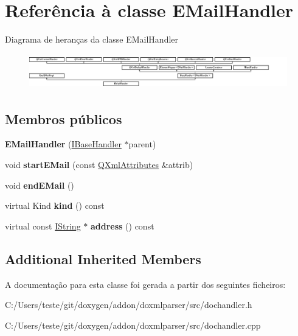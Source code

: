\hypertarget{class_e_mail_handler}{\section{Referência à classe E\-Mail\-Handler}
\label{class_e_mail_handler}
}
Diagrama de heranças da classe E\-Mail\-Handler\begin{figure}[H]
\begin{center}
\leavevmode
\includegraphics[height=1.531100cm]{class_e_mail_handler}
\end{center}
\end{figure}
\subsection*{Membros públicos}
\begin{DoxyCompactItemize}
\item 
\hypertarget{class_e_mail_handler_ab5e67ccdb0e8545996b12fb6977b1086}{{\bfseries E\-Mail\-Handler} (\hyperlink{class_i_base_handler}{I\-Base\-Handler} $\ast$parent)}\label{class_e_mail_handler_ab5e67ccdb0e8545996b12fb6977b1086}

\item 
\hypertarget{class_e_mail_handler_a10b3ee7bb8e8ffea0fa0db0a366e7c68}{void {\bfseries start\-E\-Mail} (const \hyperlink{class_q_xml_attributes}{Q\-Xml\-Attributes} \&attrib)}\label{class_e_mail_handler_a10b3ee7bb8e8ffea0fa0db0a366e7c68}

\item 
\hypertarget{class_e_mail_handler_afa50ecee29f7ff839744e58f1522a2a3}{void {\bfseries end\-E\-Mail} ()}\label{class_e_mail_handler_afa50ecee29f7ff839744e58f1522a2a3}

\item 
\hypertarget{class_e_mail_handler_af8e62c8a81ddf2283205cc8955de50eb}{virtual Kind {\bfseries kind} () const }\label{class_e_mail_handler_af8e62c8a81ddf2283205cc8955de50eb}

\item 
\hypertarget{class_e_mail_handler_afa428bc3170a5b0a1cc8546873e783db}{virtual const \hyperlink{class_i_string}{I\-String} $\ast$ {\bfseries address} () const }\label{class_e_mail_handler_afa428bc3170a5b0a1cc8546873e783db}

\end{DoxyCompactItemize}
\subsection*{Additional Inherited Members}


A documentação para esta classe foi gerada a partir dos seguintes ficheiros\-:\begin{DoxyCompactItemize}
\item 
C\-:/\-Users/teste/git/doxygen/addon/doxmlparser/src/dochandler.\-h\item 
C\-:/\-Users/teste/git/doxygen/addon/doxmlparser/src/dochandler.\-cpp\end{DoxyCompactItemize}
